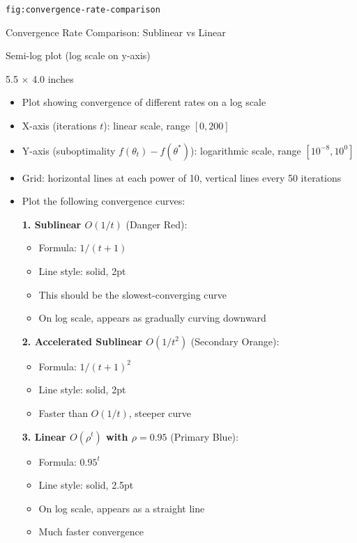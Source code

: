 \documentclass[12pt]{article}
\begin{document}
\begin{description}[style=nextline, leftmargin=0pt]
    \item[Figure ID] \texttt{fig:convergence-rate-comparison}
    \item[Title] Convergence Rate Comparison: Sublinear vs Linear
    \item[Type] Semi-log plot (log scale on y-axis)
    \item[Size] 5.5 $\times$ 4.0 inches

    \item[Visual Description]
    \begin{itemize}
        \item Plot showing convergence of different rates on a log scale
        \item X-axis (iterations $t$): linear scale, range $[0, 200]$
        \item Y-axis (suboptimality $f(\theta_t) - f(\theta^*)$): logarithmic scale, range $[10^{-8}, 10^0]$
        \item Grid: horizontal lines at each power of 10, vertical lines every 50 iterations
        \item Plot the following convergence curves:

        \textbf{1. Sublinear $O(1/t)$} (Danger Red):
        \begin{itemize}
            \item Formula: $1/(t+1)$
            \item Line style: solid, 2pt
            \item This should be the slowest-converging curve
            \item On log scale, appears as gradually curving downward
        \end{itemize}

        \textbf{2. Accelerated Sublinear $O(1/t^2)$} (Secondary Orange):
        \begin{itemize}
            \item Formula: $1/(t+1)^2$
            \item Line style: solid, 2pt
            \item Faster than $O(1/t)$, steeper curve
        \end{itemize}

        \textbf{3. Linear $O(\rho^t)$ with $\rho = 0.95$} (Primary Blue):
        \begin{itemize}
            \item Formula: $0.95^t$
            \item Line style: solid, 2.5pt
            \item On log scale, appears as a straight line
            \item Much faster convergence
        \end{itemize}


\end{itemize}
\end{description}
\end{document}

